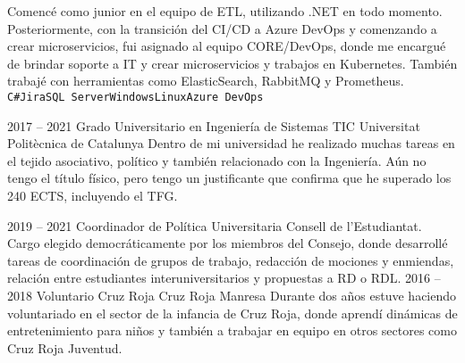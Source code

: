\documentclass[9pt]{developercv} %
\begin{document}
\begin{entrylist}
{		Comencé como junior en el equipo de ETL, utilizando .NET en todo momento. Posteriormente, con la transición del CI/CD a Azure DevOps y comenzando a crear microservicios, fui asignado al equipo CORE/DevOps, donde me encargué de brindar soporte a IT y crear microservicios y trabajos en Kubernetes. También trabajé con herramientas como ElasticSearch, RabbitMQ y Prometheus.
		\\ \texttt{C\#}\slashsep\texttt{Jira}\slashsep\texttt{SQL Server}\slashsep\texttt{Windows}\slashsep\texttt{Linux}\slashsep\texttt{Azure DevOps}}
\end{entrylist}

\clearpage



\begin{entrylist}
	\entry
	{2017 -- 2021}
	{Grado Universitario en Ingeniería de Sistemas TIC}
	{Universitat Politècnica de Catalunya}
	{Dentro de mi universidad he realizado muchas tareas en el tejido asociativo, político y también relacionado con la Ingeniería. Aún no tengo el título físico, pero tengo un justificante que confirma que he superado los 240 ECTS, incluyendo el TFG.}
\end{entrylist}


\begin{entrylist}
	\entry
	{2019 -- 2021}
	{Coordinador de Política Universitaria}
	{Consell de l'Estudiantat.}
	{Cargo elegido democráticamente por los miembros del Consejo, donde desarrollé tareas de coordinación de grupos de trabajo, redacción de mociones y enmiendas, relación entre estudiantes interuniversitarios y propuestas a RD o RDL.}
	\entry
	{2016 -- 2018}
	{Voluntario Cruz Roja}
	{Cruz Roja Manresa}
	{Durante dos años estuve haciendo voluntariado en el sector de la infancia de Cruz Roja, donde aprendí dinámicas de entretenimiento para niños y también a trabajar en equipo en otros sectores como Cruz Roja Juventud. \\ }
\end{entrylist}

\end{document}
